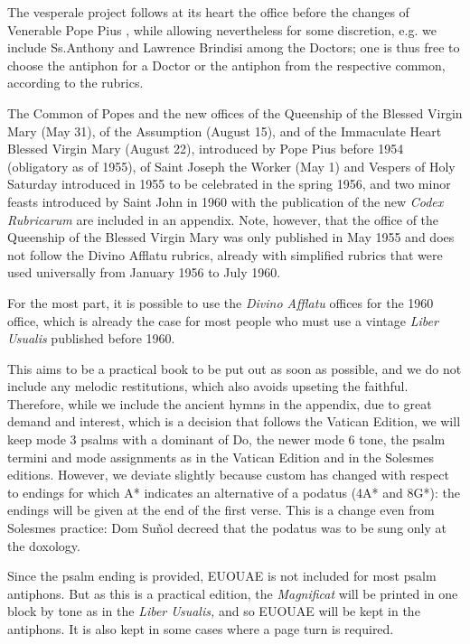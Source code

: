 \begin{enpars}
The vesperale project follows at its heart the office before the changes of Venerable Pope Pius , while allowing nevertheless for some discretion, e.g. we include Ss.\@ Anthony and Lawrence Brindisi among the Doctors; one is thus free to choose the antiphon for a Doctor or the antiphon from the respective common, according to the rubrics.

The Common of Popes and the new offices of the Queenship of the Blessed Virgin Mary (May 31), of the Assumption (August 15), and of the Immaculate Heart Blessed Virgin Mary (August 22), introduced by Pope Pius  before 1954 (obligatory as of 1955), of Saint Joseph the Worker (May 1) and Vespers of Holy Saturday introduced in 1955 to be celebrated in the spring 1956, and two minor feasts introduced by Saint John  in 1960 with the publication of the new \textit{Codex Rubricarum} are included in an appendix. Note, however, that the office of the Queenship of the Blessed Virgin Mary was only published in May 1955 and does not follow the Divino Afflatu rubrics, already with simplified rubrics that were used universally from January 1956 to July 1960.

For the most part, it is possible to use the \textit{Divino Afflatu} offices for the 1960 office, which is already the case for most people who must use a vintage \textit{Liber Usualis} published before 1960.

This aims to be a practical book to be put out as soon as possible, and we do not include any melodic restitutions, which also avoids upseting the faithful. Therefore, while we include the ancient hymns in the appendix, due to great demand and interest, which is a decision that follows the Vatican Edition, we will keep mode 3 psalms with a dominant of Do, the newer mode 6 tone, the psalm termini and mode assignments as in the Vatican Edition and in the Solesmes editions. However, we deviate slightly because custom has changed with respect to endings for which A* indicates an alternative of a podatus (4A* and 8G*): the endings will be given at the end of the first verse. This is a change even from Solesmes practice: Dom Suñol decreed that the podatus was to be sung only at the doxology.

Since the psalm ending is provided, EUOUAE is not included for most psalm antiphons. But as this is a practical edition, the \textit{Magnificat} will be printed in one block by tone as in the \textit{Liber Usualis,} and so EUOUAE will be kept in the antiphons. It is also kept in some cases where a page turn is required.


\end{enpars}
